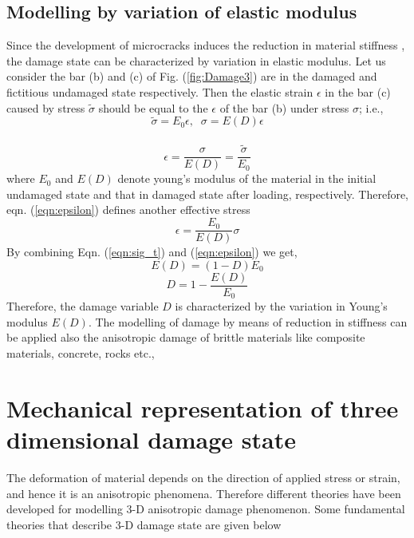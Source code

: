 \documentclass[a4paper,12pt,twoside]{report}
\begin{document}
\subsection{Modelling by variation of elastic modulus} 
\indent\indent\indent Since the development of microcracks induces the reduction in material stiffness , the damage state can be characterized by variation in elastic modulus. Let us consider the bar (b) and (c) of Fig. (\ref{fig:Damage3}) are in the damaged and fictitious undamaged state respectively. Then the elastic strain $\epsilon$ in the bar (c) caused by stress $\tilde{\sigma}$ should be equal to the $\epsilon$ of the bar (b) under stress $\sigma$; i.e.,\\
\begin{equation}
\label{eqn:sig_t2}
   \tilde{\sigma} = E_{0}\epsilon, \;\;  \sigma = E(D)\epsilon 
\end{equation}
\\
\begin{equation}
\label{eqn:epsilon}
\epsilon = \frac{\sigma}{E(D)} = \frac{\tilde{\sigma}}{E_{0}}
\end{equation}
where $E_{0}$ and $E(D)$ denote young's modulus of the material in the initial undamaged state and that in damaged state after loading, respectively. Therefore, eqn. (\ref{eqn:epsilon}) defines another effective stress\\
\begin{equation}
\label{eqn:epsilon2}
\epsilon = \frac{E_{0}}{E(D)}\sigma
\end{equation}
By combining Eqn. (\ref{eqn:sig_t}) and (\ref{eqn:epsilon}) we get,
\begin{equation}
\label{eqn:E(d)}
E(D) = (1 - D) E_{0}
\end{equation}
\begin{equation}
\label{eqn:D2}
D  = 1 - \frac{E(D)}{E_{0}}
\end{equation}
Therefore, the damage variable $D$ is characterized by the variation in Young's modulus $E(D)$. The modelling of damage by means of reduction in stiffness can be applied also the anisotropic damage of brittle materials like composite materials, concrete, rocks etc.,
\section{Mechanical representation of three dimensional damage state}
\indent\indent\indent The deformation of material depends on the direction of applied stress or strain, and hence it is an anisotropic phenomena. Therefore different theories have been developed for modelling 3-D anisotropic damage phenomenon. Some fundamental theories that describe 3-D damage state are given below 
\end{document}
